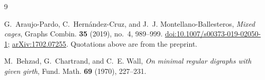 \documentclass[11pt]{amsart}
\theoremstyle{remark}
\begin{document}
\begin{thebibliography}{9}

G.~Araujo-Pardo, C.~Hern\'andez-Cruz, and J.~J. Montellano-Ballesteros,
\emph{Mixed cages},
Graphs Combin. \textbf{35} (2019), no.~4, 989--999.
\href{https://doi.org/10.1007/s00373-019-02050-1}{doi:10.1007/s00373-019-02050-1};
\href{https://arxiv.org/abs/1702.07255}{arXiv:1702.07255}.
Quotations above are from the preprint.

M.~Behzad, G.~Chartrand, and C.~E. Wall,
\emph{On minimal regular digraphs with given girth},
Fund. Math. \textbf{69} (1970), 227--231.

\end{thebibliography}
\end{document}
